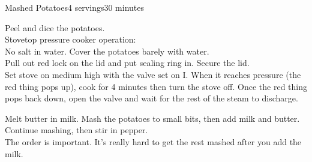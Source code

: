 \documentclass[../Cookbook.tex]{subfiles}
\begin{document}
\begin{recipe}[MashedPotatoes]{Mashed Potatoes}{4 servings}{30 minutes}

Peel and dice the potatoes.\\
Stovetop pressure cooker operation:\\
No salt in water. Cover the potatoes barely with water.\\
Pull out red lock on the lid and put sealing ring in. Secure the lid.\\
Set stove on medium high with the valve set on I. When it reaches pressure (the red thing pops up), cook for 4 minutes then turn the stove off. Once the red thing pops back down, open the valve and wait for the rest of the steam to discharge.

Melt butter in milk. Mash the potatoes to small bits, then add milk and butter. Continue mashing, then stir in pepper.\\
The order is important. It's really hard to get the rest mashed after you add the milk.

\end{recipe}
\end{document}
